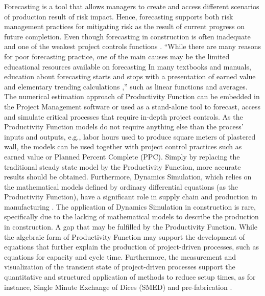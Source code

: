 \documentclass{article}
\begin{document}
Forecasting is a tool that allows managers to create and access different scenarios of production result of risk impact.
Hence, forecasting supports both risk management practices for mitigating risk as the result of current progress on future completion.
Even though forecasting in construction is often inadequate and one of the weakest project controls functions \citep{ConstructionIndustryInstitute2012}.
``While there are many reasons for poor forecasting practice, one of the main causes may be the limited educational resources available on forecasting
In many textbooks and manuals, education about forecasting starts and stops with a presentation of earned value and elementary trending calculations \citep{ConstructionIndustryInstitute2012a},'' such as linear functions and averages.
The numerical estimation approach of Productivity Function can be embedded in the Project Management software or used as a stand-alone tool to forecast, access and simulate critical processes that require in-depth project controls.
As the Productivity Function models do not require anything else than the process' inputs and outputs, e.g., labor hours used to produce square meters of plastered wall, the models can be used together with project control practices such as earned value or Planned Percent Complete (PPC).
Simply by replacing the traditional steady state model by the Productivity Function, more accurate results should be obtained.
Furthermore, Dynamics Simulation, which relies on the mathematical models defined by ordinary differential equations (as the Productivity Function), have a significant role in supply chain \citep{Higuchi2004} and production in manufacturing \citep{Forrester1997}.
The application of Dynamics Simulation in construction is rare, specifically due to the lacking of mathematical models to describe the production in construction.
A gap that may be fulfilled by the Productivity Function.
While the algebraic form of Productivity Function may support the development of equations that further explain the production of project-driven processes, such as equations for capacity and cycle time.
Furthermore, the measurement and visualization of the transient state of project-driven processes support the quantitative and structured application of methods to reduce setup times, as for instance, Single Minute Exchange of Dices (SMED) and pre-fabrication \citep{Antunes2016}.
\end{document}
